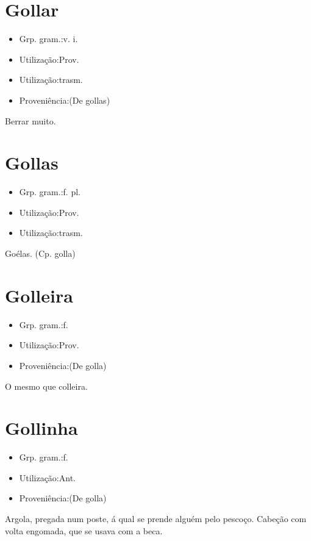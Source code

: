 \section{Gollar}
\begin{itemize}
\item {Grp. gram.:v. i.}
\end{itemize}
\begin{itemize}
\item {Utilização:Prov.}
\end{itemize}
\begin{itemize}
\item {Utilização:trasm.}
\end{itemize}
\begin{itemize}
\item {Proveniência:(De \textunderscore gollas\textunderscore )}
\end{itemize}
Berrar muito.
\section{Gollas}
\begin{itemize}
\item {Grp. gram.:f. pl.}
\end{itemize}
\begin{itemize}
\item {Utilização:Prov.}
\end{itemize}
\begin{itemize}
\item {Utilização:trasm.}
\end{itemize}
Goélas.
(Cp. \textunderscore golla\textunderscore )
\section{Golleira}
\begin{itemize}
\item {Grp. gram.:f.}
\end{itemize}
\begin{itemize}
\item {Utilização:Prov.}
\end{itemize}
\begin{itemize}
\item {Proveniência:(De \textunderscore golla\textunderscore )}
\end{itemize}
O mesmo que \textunderscore colleira\textunderscore .
\section{Gollinha}
\begin{itemize}
\item {Grp. gram.:f.}
\end{itemize}
\begin{itemize}
\item {Utilização:Ant.}
\end{itemize}
\begin{itemize}
\item {Proveniência:(De \textunderscore golla\textunderscore )}
\end{itemize}
Argola, pregada num poste, á qual se prende alguém pelo pescoço.
Cabeção com volta engomada, que se usava com a beca.
